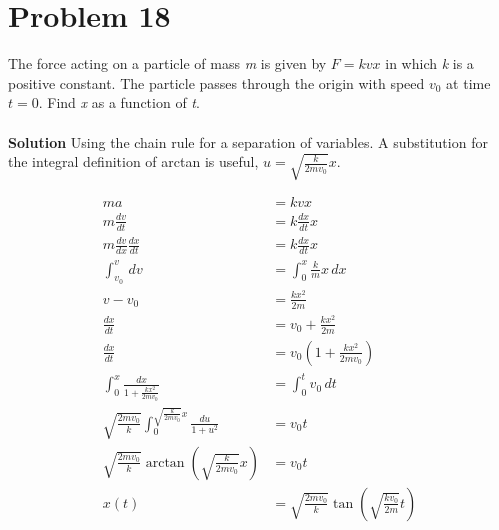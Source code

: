 \documentclass[]{article}
\newcommand{\bd}{\textbf}
\begin{document}
\section{Problem 18}

The force acting on a particle of mass \textit{m} is given by $ F = kvx $ in which \textit{k} is a positive constant. The particle passes through the origin with speed $ v_0 $ at time $ t = 0 $. Find \textit{x} as a function of \textit{t}.
\\\\
\bd{Solution} Using the chain rule for a separation of variables. A substitution for the integral definition of arctan is useful, $ u = \sqrt{\frac{k}{2mv_0}} x $.

\begin{equation}
	\begin{split}
		ma &= kvx \\
		m\frac{dv}{dt} &= k\frac{dx}{dt}x \\
		m\frac{dv}{dx} \frac{dx}{dt} &= k\frac{dx}{dt}x \\
		\int_{v_0}^{v} \, dv &= \int_{0}^{x} \frac{k}{m} x \, dx \\
		v - v_0 &= \frac{kx^2}{2m} \\
		\frac{dx}{dt} &= v_0 + \frac{kx^2}{2m} \\
		\frac{dx}{dt} &= v_0\left(1 + \frac{kx^2}{2mv_0}\right) \\
		\int_{0}^{x} \frac{dx}{1 + \frac{kx^2}{2mv_0}} &= \int_{0}^{t} v_0 \, dt \\
		\sqrt{\frac{2mv_0}{k}} \int_{0}^{\sqrt{\frac{k}{2mv_0}} x } \frac{du}{1 + u^2} &= v_0 t \\
		\sqrt{\frac{2mv_0}{k}} \arctan \left( \sqrt{\frac{k}{2mv_0} } x \right) &= v_0 t \\
		x(t) &= \sqrt{\frac{2mv_0}{k}} \tan \left( \sqrt{\frac{kv_0}{2m}} t \right)
	\end{split}
\end{equation}
\end{document}
